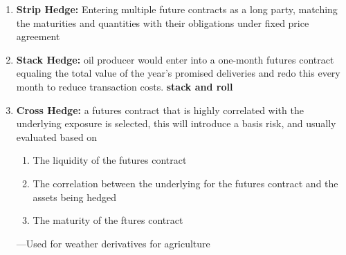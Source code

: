\documentclass[11pt,fleqn]{report} %
\numberwithin{equation}{section} %
\numberwithin{figure}{section} %
\numberwithin{table}{section} %
\begin{document}
\begin{definition}
\begin{enumerate}
    \item \textbf{Strip Hedge:} Entering multiple future contracts as a long party, matching the maturities and quantities with their obligations under fixed price agreement
    \item \textbf{Stack Hedge:} oil producer would enter into a one-month futures contract equaling the total value of the year's promised deliveries and redo this every month to reduce transaction costs. \textbf{stack and roll}
    \item \textbf{Cross Hedge:} a futures contract that is highly correlated with the underlying exposure is selected, this will introduce a basis risk, and usually evaluated based on
    \begin{enumerate}
        \item The liquidity of the futures contract
        \item The correlation between the underlying for the futures contract and the assets being hedged
        \item The maturity of the ftures contract
    \end{enumerate}
    ---Used for weather derivatives for agriculture
\end{enumerate}
\end{definition}
\end{document}
